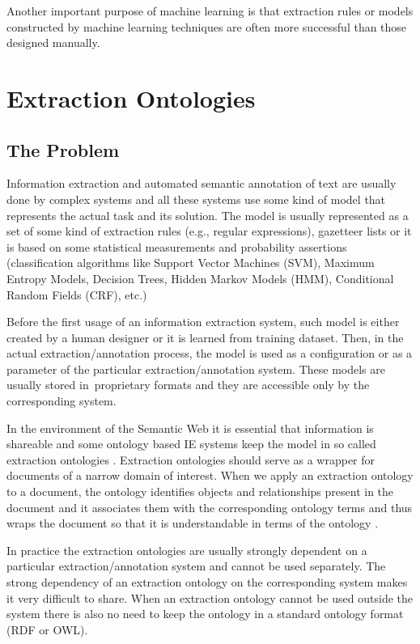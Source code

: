 Another important purpose of machine learning is that extraction rules or models constructed by machine learning techniques are often more successful than those designed manually.

\section{Extraction Ontologies}

\subsection{The Problem}

Information extraction and automated semantic annotation of text are usually done by complex systems and all these systems use some kind of model that represents the actual task and its solution. The model is usually represented as a set of some kind of extraction rules (e.g., regular expressions), gazetteer lists or it is based on some statistical measurements and probability assertions (classification algorithms like Support Vector Machines (SVM), Maximum Entropy Models, Decision Trees, Hidden Markov Models (HMM), Conditional Random Fields (CRF), etc.)



Before the first usage of an information extraction system, such model is either created by a human designer or it is learned from training dataset. Then, in the actual extraction/annotation process, the model is used as a configuration or as a parameter of the particular extraction/annotation system. These models are usually stored in~proprietary formats and they are accessible only by the corresponding system.



In the environment of the Semantic Web it is essential that information is shareable and some ontology based IE systems keep the model in so called extraction ontologies \cite{DBLP:conf/er/EmbleyTL02}. Extraction ontologies should serve as a wrapper for documents of a narrow domain of interest. When we apply an extraction ontology to a document, the ontology identifies objects and relationships present in the document and it associates them with the corresponding ontology terms and thus wraps the document so that it is understandable in terms of the ontology \cite{DBLP:conf/er/EmbleyTL02}.



In practice the extraction ontologies are usually strongly dependent on a particular extraction/annotation system and cannot be used separately. The strong dependency of an extraction ontology on the corresponding system makes it very difficult to share. When an extraction ontology cannot be used outside the system there is also no need to keep the ontology in a standard ontology format (RDF or OWL).



